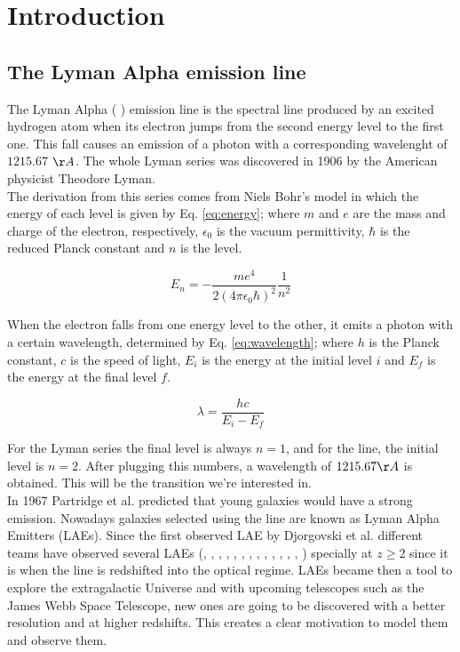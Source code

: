 \setcounter{equation}{0}
\chapter{Introduction}

\section{The Lyman Alpha emission line}

The Lyman Alpha ( \lya) emission line is the spectral line produced by an excited hydrogen atom when its electron jumps from the second energy level to the first one. This fall causes an emission of a photon with a corresponding wavelenght of $1215.67$ $\AA$. The whole Lyman series was discovered in 1906 by the American physicist Theodore Lyman. \\

The derivation from this series comes from Niels Bohr's model in which the energy of each level is given by Eq. \ref{eq:energy}; where $m$ and $e$ are the mass and charge of the electron, respectively, $\epsilon_0$ is the vacuum permittivity, $\hbar$ is the reduced Planck constant and $n$ is the level. 

\begin{equation}
\label{eq:energy}
E_n = -\frac{me^4}{2(4\pi\epsilon_0\hbar)^2}\frac{1}{n^2}
\end{equation}

When the electron falls from one energy level to the other, it emits a photon with a certain wavelength, determined by Eq. \ref{eq:wavelength}; where $h$ is the Planck constant, $c$ is the speed of light, $E_i$ is the energy at the initial level $i$ and $E_f$ is the energy at the final level $f$.

\begin{equation}
\label{eq:wavelength}
\lambda = \frac{hc}{E_i-E_f}
\end{equation}

For the Lyman series the final level is always $n=1$, and for the \lya line, the initial level is $n=2$. After plugging this numbers, a wavelength of $1215.67\AA$ is obtained. This will be the transition we're interested in.\\

In 1967 Partridge et al. \cite{PartridgePeebles} predicted that young galaxies would have a strong \lya  emission. Nowadays galaxies selected using the \lya line are known as Lyman Alpha Emitters (LAEs). Since the first observed LAE by Djorgovski et al. \cite{DjorgovskiThompson} different teams have observed several LAEs (\cite{Rhoads00}, \cite{Gawiser2007}, \cite{Koehler2007}, \cite{Ouchi08}, \cite{Yamada2012}, \cite{Schenker2012}, \cite{Kulas12}, \cite{Yamada2012}, \cite{Chonis2013}, \cite{Finkelstein2013}, \cite{Ostlin14}, \cite{Hayes2014}, \cite{Faisst2014}, \cite{Fumagalli2015}) specially at $z\geq2$ since it is when the  line is redshifted into the optical regime. LAEs became then a tool to explore the extragalactic Universe and with upcoming telescopes such as the James Webb Space Telescope, new ones are going to be discovered with a better resolution and at higher redshifts. This creates a clear motivation to model them and observe them. \\

